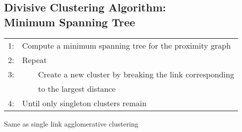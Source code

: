 \subsection{Divisive Clustering Algorithm: \\ Minimum Spanning Tree}
\begin{table}[h!]
\begin{tabular}{r p{12cm}}
\hline
    1: & Compute a minimum spanning tree for the proximity graph \\
    2: & Repeat \\
    3: & \ \ \ \ Create a new cluster by breaking the link corresponding \\
       & \ \ \ \ to the largest distance \\
    4: & Until only singleton clusters remain \\
\hline
\end{tabular}
\end{table}
\noindent Same as single link agglomerative clustering